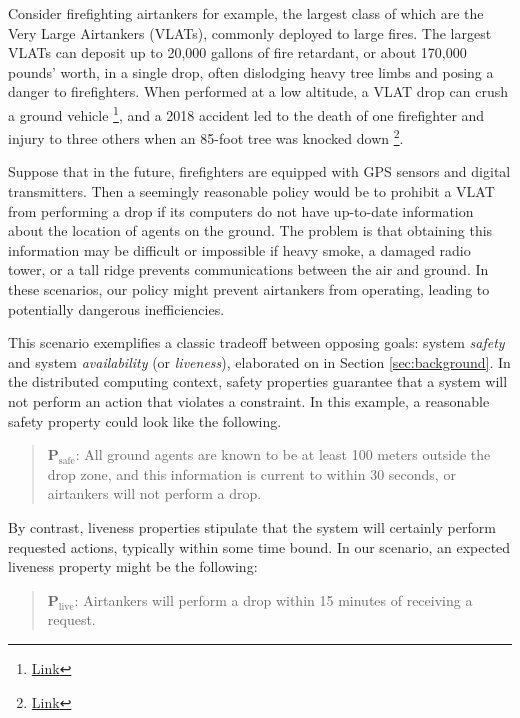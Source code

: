 \documentclass[]             %
{NASA}                       %
\theoremstyle{definition}
\begin{document}
Consider firefighting airtankers for example, the largest class of which
are the Very Large Airtankers (VLATs), commonly deployed to large fires.
The largest VLATs can deposit up to 20,000 gallons of fire retardant, or
about 170,000 pounds' worth, in a single drop, often dislodging heavy
tree limbs and posing a danger to firefighters. When performed at a low
altitude, a VLAT drop can crush a ground vehicle \footnote{\href{https://www.youtube.com/watch?v=ONdSoiI4zIA}{Link}},
and a 2018 accident led to the death of one firefighter and injury to
three others when an 85-foot tree was knocked down \footnote{\href{https://www.firerescue1.com/flame-retardants/articles/utah-battalion-chiefs-death-may-have-been-linked-to-airplane-retardant-drop-zWKw179u1IXBB8p9/}{Link}}.

Suppose that in the future, firefighters are equipped with GPS sensors
and digital transmitters. Then a seemingly reasonable policy would be to
prohibit a VLAT from performing a drop if its computers do not have
up-to-date information about the location of agents on the ground. The
problem is that obtaining this information may be difficult or
impossible if heavy smoke, a damaged radio tower, or a tall ridge
prevents communications between the air and ground. In these scenarios,
our policy might prevent airtankers from operating, leading to
potentially dangerous inefficiencies.

This scenario exemplifies a classic tradeoff between opposing goals:
system \emph{safety} and system \emph{availability} (or
\emph{liveness}), elaborated on in Section \ref{sec:background}. In the
distributed computing context, safety properties guarantee that a system
will not perform an action that violates a constraint. In this example,
a reasonable safety property could look like the following.

\begin{quote}
    $\textbf{P}_\textrm{safe}$: All ground agents are
known to be at least 100 meters outside the drop zone, and this
information is current to within 30 seconds, or airtankers will not perform a
drop.
\end{quote}

\noindent By contrast, liveness properties stipulate that the system
will certainly perform requested actions, typically within some time
bound. In our scenario, an expected liveness property might be the
following:

\begin{quote}
    $\textbf{P}_\textrm{live}$:
    Airtankers will perform a drop within 15 minutes of receiving a request.
\end{quote}
\end{document}
